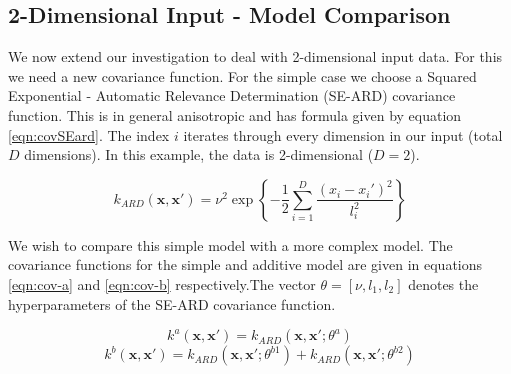 \documentclass[]{article}
\begin{document}
\subsection{2-Dimensional Input - Model Comparison}

We now extend our investigation to deal with 2-dimensional input data. For this we need a new covariance function. For the simple case we choose a Squared Exponential - Automatic Relevance Determination (SE-ARD) covariance function. This is in general anisotropic and has formula given by equation \ref{eqn:covSEard}. The index $i$ iterates through every dimension in our input (total $D$ dimensions). In this example, the data is 2-dimensional ($D=2$).

\begin{equation}
k_{ARD}(\mathbf{x}, \mathbf{x}') = \nu^2 \exp\left\{- \frac{1}{2} \sum_{i=1}^{D}\frac{(x_i-x_i')^2}{l_i^2}\right\}
\label{eqn:covSEard}
\end{equation}

We wish to compare this simple model with a more complex model. The covariance functions for the simple and additive model are given in equations \ref{eqn:cov-a} and \ref{eqn:cov-b} respectively.The vector $\theta = [\nu, l_1, l_2]$ denotes the hyperparameters of the SE-ARD covariance function.

\begin{equation}
k^a(\mathbf{x}, \mathbf{x}') = k_{ARD}(\mathbf{x}, \mathbf{x}' ; \theta^a)
\label{eqn:cov-a}
\end{equation}
\begin{equation}
k^b(\mathbf{x}, \mathbf{x}') = k_{ARD}(\mathbf{x}, \mathbf{x}' ; \theta^{b1})
+ k_{ARD}(\mathbf{x}, \mathbf{x}' ; \theta^{b2})
\label{eqn:cov-b}
\end{equation}
\end{document}
